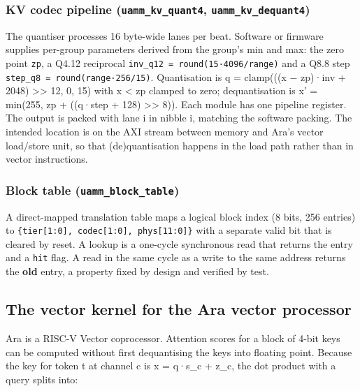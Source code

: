 \documentclass[12pt,a4paper]{report}
\begin{document}
\subsubsection{KV codec pipeline (\texttt{uamm\_\allowbreak{}\allowbreak{}kv\_\allowbreak{}\allowbreak{}quant4}, \texttt{uamm\_\allowbreak{}\allowbreak{}kv\_\allowbreak{}\allowbreak{}dequant4})}\label{sec:5_8_2}
The quantiser processes 16 byte-wide lanes per beat. Software or firmware supplies per-group parameters derived from the group's min and max: the zero point \texttt{zp}, a Q4.12 reciprocal \texttt{inv\_\allowbreak{}\allowbreak{}q12 = round(15·4096/\allowbreak{}range)} and a Q8.8 step \texttt{step\_\allowbreak{}\allowbreak{}q8 = round(range·256/\allowbreak{}15)}. Quantisation is q = clamp(((x − zp)·inv + 2048) >> 12, 0, 15) with x < zp clamped to zero; dequantisation is x' = min(255, zp + ((q·step + 128) >> 8)). Each module has one pipeline register. The output is packed with lane i in nibble i, matching the software packing. The intended location is on the AXI stream between memory and Ara's vector load/store unit, so that (de)quantisation happens in the load path rather than in vector instructions.

\subsubsection{Block table (\texttt{uamm\_\allowbreak{}\allowbreak{}block\_\allowbreak{}\allowbreak{}table})}\label{sec:5_8_3}
A direct-mapped translation table maps a logical block index (8 bits, 256 entries) to \texttt{\{tier[1:0], codec[1:0], phys[11:0]\}} with a separate valid bit that is cleared by reset. A lookup is a one-cycle synchronous read that returns the entry and a \texttt{hit} flag. A read in the same cycle as a write to the same address returns the \textbf{old} entry, a property fixed by design and verified by test.

\subsection{The vector kernel for the Ara vector processor}\label{sec:5_9}
Ara is a RISC-V Vector coprocessor. Attention scores for a block of 4-bit keys can be computed without first dequantising the keys into floating point. Because the key for token t at channel c is x = q·s\_\allowbreak{}c + z\_\allowbreak{}c, the dot product with a query splits into:
\end{document}
